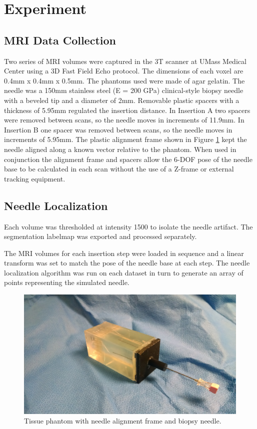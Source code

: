 \section{Experiment}
\subsection{MRI Data Collection}
Two series of MRI volumes were captured in the 3T scanner at UMass Medical Center using a 3D Fast Field Echo protocol. The dimensions of each voxel are 0.4mm x 0.4mm x 0.5mm. The phantoms used were made of agar gelatin. The needle was a 150mm stainless steel (E = 200 GPa) clinical-style biopsy needle with a beveled tip and a diameter of 2mm. Removable plastic spacers with a thickness of 5.95mm regulated the insertion distance. In Insertion A two spacers were removed between scans, so the needle moves in increments of 11.9mm. In Insertion B one spacer was removed between scans, so the needle moves in increments of 5.95mm. The plastic alignment frame shown in Figure \ref{fig:needle_guide} kept the needle aligned along a known vector relative to the phantom. When used in conjunction the alignment frame and spacers allow the 6-DOF pose of the needle base to be calculated in each scan without the use of a Z-frame or external tracking equipment.

\subsection{Needle Localization}
Each volume was thresholded at intensity 1500 to isolate the needle artifact. The segmentation labelmap was exported and processed separately.

The MRI volumes for each insertion step were loaded in sequence and a linear transform was set to match the pose of the needle base at each step. The needle localization algorithm was run on each dataset in turn to generate an array of points representing the simulated needle.

\begin{figure}[h]
\includegraphics[width=1.0\textwidth]{Fig/chap5/phantom_with_needle_guide_small_2.jpg}
\caption{Tissue phantom with needle alignment frame and biopsy needle.}
\label{fig:needle_guide}
\end{figure}

